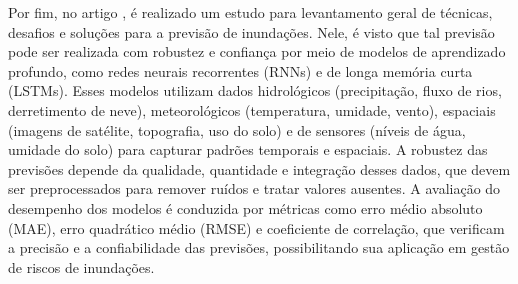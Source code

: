 Por fim, no artigo \cite {hasan2023state}, é realizado um estudo para levantamento geral de técnicas, desafios e soluções para a previsão de inundações. Nele, é visto que tal previsão pode ser realizada com robustez e confiança por meio de modelos de aprendizado profundo, como redes neurais recorrentes (RNNs) e de longa memória curta (LSTMs). Esses modelos utilizam dados hidrológicos (precipitação, fluxo de rios, derretimento de neve), meteorológicos (temperatura, umidade, vento), espaciais (imagens de satélite, topografia, uso do solo) e de sensores (níveis de água, umidade do solo) para capturar padrões temporais e espaciais. A robustez das previsões depende da qualidade, quantidade e integração desses dados, que devem ser preprocessados para remover ruídos e tratar valores ausentes. A avaliação do desempenho dos modelos é conduzida por métricas como erro médio absoluto (MAE), erro quadrático médio (RMSE) e coeficiente de correlação, que verificam a precisão e a confiabilidade das previsões, possibilitando sua aplicação em gestão de riscos de inundações.


